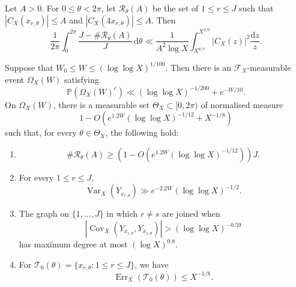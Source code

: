 \documentclass[10pt,a4paper]{amsart}
\newcommand{\cov}{\operatorname{Cov}}
\newcommand{\p}{\mathbb{P}}
\newcommand{\var}{\operatorname{Var}}
\begin{document}
\begin{lemma}
\label{lem:shift-occupancy}
Let \(A>0\). For \(0\leq\theta<2\pi\), let
\(\mathcal R_\theta(A)\) be the set of \(1\leq r\leq J\) such that
\(
 |C_X(x_{r,\theta})|\leq A\) and \( |C_X(4x_{r,\theta})|\leq A.
\)
Then
\begin{equation}\label{eq:mean-bad-occupancy}
 \frac1{2\pi}\int_0^{2\pi}
 \frac{J-\#\mathcal R_\theta(A)}{J}\,\mathrm{d}\theta
 \ll
 \frac1{A^2\log X}
 \int_{X^{8/7}}^{X^{4/3}}
 |C_X(z)|^2\frac{\mathrm{d}z}{z}.
\end{equation}

\end{lemma}

\begin{lemma}
\label{lem:aggregate-good-event}
Suppose that \(W_0\leq W\leq(\log\log X)^{1/100}\).
Then there is an \(\mathscr F_X\)-measurable event \(\Omega_X(W)\) satisfying
\begin{equation}\label{eq:old-good-probability}
 \p(\Omega_X(W)^c)
 \ll
 (\log\log X)^{-1/200}
 +e^{-W/10}.
\end{equation}
On \(\Omega_X(W)\), there is a measurable set
\(\Theta_X\subset[0,2\pi)\) of normalised measure
\[
 1-O\left(
 e^{1.2W}(\log\log X)^{-1/12}+X^{-1/8}
 \right)
\]
such that, for every \(\theta\in\Theta_X\), the following hold:
\begin{enumerate}
 \item
 \[
  \#\mathcal R_\theta(A)
  \geq
  \left(
  1-O\left(e^{1.2W}(\log\log X)^{-1/12}\right)
  \right)J.
 \]

 \item For every \(1\leq r\leq J\),
 \begin{equation}\label{eq:increment-variance-input}
  \var_X(Y_{x_{r,\theta}})
  \gg e^{-2.2W}(\log\log X)^{-1/2}.
 \end{equation}

 \item The graph on \(\{1,\ldots,J\}\) in which \(r\ne s\) are joined when
 \begin{equation}\label{eq:bad-covariance-edge}
  \left|
  \cov_X(Y_{x_{r,\theta}},Y_{x_{s,\theta}})
  \right|
  >(\log\log X)^{-0.59}
 \end{equation}
 has maximum degree at most \((\log X)^{0.8}\).

 \item For
 \(\mathcal T_0(\theta)=\{x_{r,\theta}:1\leq r\leq J\}\), we have
 \[
  \operatorname{Err}_X(\mathcal T_0(\theta))\leq X^{-1/8}.
 \]
\end{enumerate}
\end{lemma}
\end{document}
